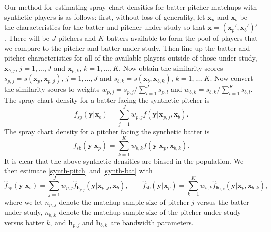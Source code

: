 \documentclass[11pt]{article}
\newcommand{\R}{\mathbb{R}}
\newcommand{\Xbf}{\textbf{X}}
\newcommand{\V}{\textbf{V}}
\newcommand{\W}{\textbf{W}}
\newcommand{\y}{\textbf{y}}
\newcommand{\x}{\textbf{x}}
\newcommand{\h}{\textbf{h}}
\newcommand{\Wstar}{\W^{\textstyle{*}}}
\begin{document}
Our method for estimating spray chart densities for batter-pitcher matchups with synthetic players is as follows: first, without loss of generality, let $\x_p$ and $\x_b$ be the characteristics for the batter and pitcher under study so that $\x = (\x_p',\x_b')'$. There will be $J$ pitchers and $K$ batters available to form the pool of players that we compare to the pitcher and batter under study. Then line up the batter and pitcher characteristics for all of the available players outside of those under study, $\x_{b,j}$, $j = 1,...,J$ and $\x_{p,k}$, $k = 1,...,K$. Now obtain the similarity scores $s_{p,j} = s(\x_p,\x_{p,j})$, $j = 1,...,J$ and $s_{b,k} = s(\x_b,\x_{b,k})$, $k = 1,...,K$. Now convert the similarity scores to weights $w_{p,j} = s_{p,j} / \sum_{l=1}^{J}s_{p,l}$ and $w_{b,k} = s_{b,k} / \sum_{l=1}^{K}s_{b,l}$. The spray chart density for a batter facing the synthetic pitcher is 
\begin{equation} \label{synth-pitch}
  f_{\text{sp}}(\y|\x_b) = \sum_{j=1}^J w_{p,j}f(\y|\x_{p,j},\x_b).
\end{equation}
The spray chart density for a pitcher facing the synthetic batter is 
\begin{equation} \label{synth-bat}
  f_{\text{sb}}(\y|\x_p) = \sum_{k=1}^K w_{b,k}f(\y|\x_p,\x_{b,k}).
\end{equation}
It is clear that the above synthetic densities are biased in the population. We then estimate \eqref{synth-pitch} and \eqref{synth-bat} with
\begin{equation} \label{synth-est}
  \hat f_{\text{sp}}(\y|\x_b) = \sum_{j=1}^J w_{p,j}\hat f_{\h_{p,j}}(\y|\x_{p,j},\x_b), 
  \qquad
  \hat f_{\text{sb}}(\y|\x_p) = \sum_{k=1}^K w_{b,k}\hat f_{\h_{b,k}}(\y|\x_p,\x_{b,k}),
\end{equation}
where we let $n_{p,j}$ denote the matchup sample size of pitcher $j$ versus the batter under study, $n_{b,k}$ denote the matchup sample size of the pitcher under study versus batter $k$, and $\h_{p,j}$ and $\h_{b,k}$ are bandwidth parameters.

\end{document}
